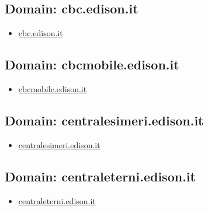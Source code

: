 \documentclass{article}
\begin{document}
    \subsection{Domain: cbc.edison.it}
    \begin{itemize}
        
            
                
                \item \href{ http://cbc.edison.it/}{ cbc.edison.it }
            
        
    \end{itemize}

    \subsection{Domain: cbcmobile.edison.it}
    \begin{itemize}
        
            
                
                \item \href{ http://cbcmobile.edison.it/}{ cbcmobile.edison.it }
            
        
    \end{itemize}

    \subsection{Domain: centralesimeri.edison.it}
    \begin{itemize}
        
            
                
                \item \href{ https://centralesimeri.edison.it/}{ centralesimeri.edison.it }
            
        
    \end{itemize}

    \subsection{Domain: centraleterni.edison.it}
    \begin{itemize}
        
            
                
                \item \href{ http://centraleterni.edison.it/}{ centraleterni.edison.it }
            
        
    \end{itemize}
\end{document}
